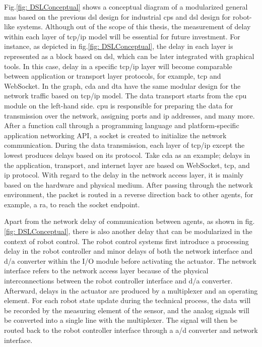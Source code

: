 Fig.\ref{fig: DSLConceptual} shows a conceptual diagram of a modularized 
general \gls{mas} based on the previous \gls{dsl} design \cite{hujo_toward_2022} 
for industrial \gls{cps} and \gls{dsl} design for robot-like 
systems\cite{volpert_supporting_nodate}. 
Although out of the scope of this thesis, the measurement of delay within 
each layer of \gls{tcp/ip} model will be essential for future investment.
For instance, as depicted in fig.\ref{fig: DSLConceptual}, the delay in 
each layer is represented as a block based on \gls{dsl}, which can be later integrated 
with graphical tools.
In this case, delay in a specific \gls{tcp/ip} layer will become comparable between 
application or transport layer protocols, for example, 
\gls{tcp} and WebSocket. In the graph, \gls{cda} and \gls{dta} 
have the same modular design for the network traffic based on \gls{tcp/ip} 
model. The data transport starts from the \gls{cpu} module on the left-hand side. 
\gls{cpu} is responsible for preparing the data for transmission over the network, 
assigning ports and \gls{ip} addresses, and many more. After a function call 
through a programming language and platform-specific application 
networking API, a socket is created to initialize the network communication. 
During the data transmission, each layer of \gls{tcp/ip} except the lowest 
produces delays 
based on its protocol. Take \gls{cda} as an example; delays in the application, 
transport, and internet layer are based on WebSocket, \gls{tcp}, and 
\gls{ip} protocol. With regard to the delay in the network access layer, it is mainly 
based on the hardware and physical medium. After passing through the network 
environment, the packet is routed in a reverse direction back to other agents, 
for example, a \gls{ra}, to reach the socket endpoint.  



Apart from the network delay of communication between 
agents, as shown in fig.\ref{fig: DSLConceptual}, there is also another 
delay that can be modularized in 
the context of robot control. The robot control systems first introduce a processing 
delay in the robot controller and minor delays of both the network interface and 
\gls{d/a} converter within the I/O module before activating 
the actuator. The network interface refers to the network access layer because of 
the physical interconnections between the robot controller interface and \gls{d/a} converter. 
Afterward, delays in the actuator are produced by a multiplexer and an operating element. 
For each robot state update during the technical process, the data will be recorded 
by the measuring element of the sensor, and the analog signals will be 
converted into a single line with the multiplexer. The signal will then be routed 
back to the robot controller interface through a \gls{a/d} converter and network interface. 








